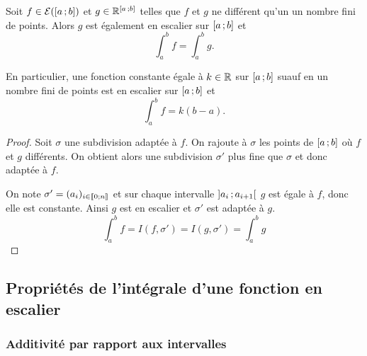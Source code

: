 \begin{prop}
  Soit \(f \in \mathcal{E}(\left[ a \, ;  b \right])\) et \(g \in \mathbb{R}^{\left[ a \, ;  b \right]}\) telles que \(f\) et \(g\) ne différent qu'un un nombre fini de points. Alors \(g\) est également en escalier sur \(\left[ a \, ;  b \right]\) et
  \begin{equation}
    \int_a^b f = \int_a^b g.
  \end{equation}
\end{prop}
En particulier, une fonction constante égale à \(k \in \mathbb{R}\) sur \(\left[ a \, ;  b \right]\) suauf en un nombre fini de points est en escalier sur \(\left[ a \, ;  b \right]\) et
\begin{equation}
  \int_a^b f =k(b-a).
\end{equation}

\begin{proof}
  Soit \(\sigma\) une subdivision adaptée à \(f\). On rajoute à \(\sigma\) les points de \(\left[ a \, ;  b \right]\) où \(f\) et \(g\) différents. On obtient alors une subdivision \(\sigma'\) plus fine que \(\sigma\) et donc adaptée à \(f\).

  On note \(\sigma'=(a_i)_{i \in \mathopen{\llbracket}0\mathclose{}\mathpunct{};n\mathclose{\rrbracket}}\) et sur chaque intervalle \(\left] a_i \, ;  a_{i+1} \right[\) \(g\) est égale à \(f\), donc elle est constante. Ainsi \(g\) est en escalier et \(\sigma'\) est adaptée à \(g\).
  \begin{equation}
    \int_a^bf = I(f,\sigma')=I(g,\sigma')=\int_a^bg
  \end{equation}
\end{proof}

\subsection{Propriétés de l'intégrale d'une fonction en escalier}

\subsubsection{Additivité par rapport aux intervalles}

